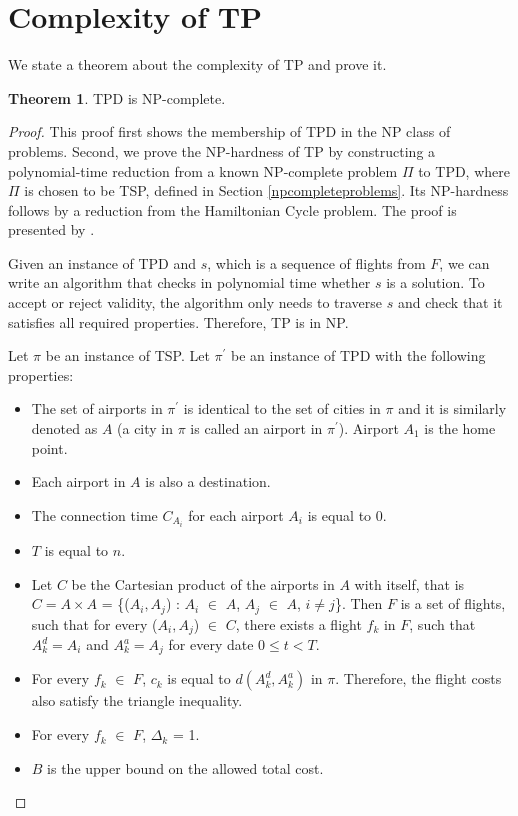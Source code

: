 \documentclass{mprop}
\theoremstyle{definition}
\newtheorem{theorem}{Theorem}
\begin{document}
\section{Complexity of TP}
\label{sec:tpcomplexity}
We state a theorem about the complexity of TP and prove it.
\begin{theorem}
TPD is NP-complete.
\end{theorem}

\begin{proof}
\label{npcompleteproof}
This proof first shows the membership of TPD in the NP class of problems. Second, we prove the NP-hardness of TP by constructing a polynomial-time reduction from a known NP-complete problem $\Pi$ to TPD, where $\Pi$ is chosen to be TSP, defined in Section \ref{npcompleteproblems}. Its NP-hardness follows by a reduction from the Hamiltonian Cycle problem. The proof is presented by \citet{thebible}.

Given an instance of TPD and $s$, which is a sequence of flights from $F$, we can write an algorithm that checks in polynomial time whether $s$ is a solution. To accept or reject validity, the algorithm only needs to traverse $s$ and check that it satisfies all required properties. Therefore, TP is in NP.

Let $\pi$ be an instance of TSP. Let $\pi^{\prime}$ be an instance of TPD with the following properties:
\begin{itemize}
\item The set of airports in $\pi^{\prime}$ is identical to the set of cities in $\pi$ and it is similarly denoted as $A$ (a city in $\pi$ is called an airport in $\pi^{\prime}$). Airport $A_{1}$ is the home point.
\item Each airport in $A$ is also a destination.
\item The connection time $C_{A_{i}}$ for each airport $A_{i}$ is equal to 0.
\item $T$ is equal to $n$.
\item Let $C$ be the Cartesian product of the airports in $A$ with itself, that is $C = A \times A$ = \{($A_{i}, A_{j}$) : $A_{i}$ $\in$ $A$, $A_{j}$ $\in$ $A$, $i \neq j$\}. Then $F$ is a set of flights, such that for every ($A_{i}, A_{j}$) $\in$ $C$, there exists a flight $f_{k}$ in $F$, such that $A^{d}_{k} = A_{i}$ and $A^{a}_{k} = A_{j}$ for every date $0 \leq t < T$.
\item For every $f_{k}$ $\in$ $F$, $c_{k}$ is equal to $d(A^{d}_{k}, A^{a}_{k})$ in $\pi$. Therefore, the flight costs also satisfy the triangle inequality.
\item For every $f_{k}$ $\in$ $F$, $\Delta_{k}$ = 1.
\item $B$ is the upper bound on the allowed total cost.
\end{itemize}


\end{proof}
\end{document}
